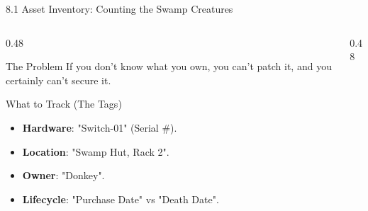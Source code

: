 \documentclass[aspectratio=169]{beamer}  %
\begin{document}
\begin{frame}{8.1 Asset Inventory: Counting the Swamp Creatures}
    \begin{columns}[T]
        \begin{column}{0.48\textwidth}
            \begin{block}{The Problem}
                \footnotesize
                If you don't know what you own, you can't patch it, and you certainly can't secure it.
            \end{block}
            \begin{exampleblock}{What to Track (The Tags)}
                \footnotesize
                \begin{itemize}
                    \item \textbf{Hardware}: "Switch-01" (Serial \#).
                    \item \textbf{Location}: "Swamp Hut, Rack 2".
                    \item \textbf{Owner}: "Donkey".
                    \item \textbf{Lifecycle}: "Purchase Date" vs "Death Date".
                \end{itemize}
            \end{exampleblock}
        \end{column}
        \begin{column}{0.48\textwidth}
            \begin{center}
            \end{center}
        \end{column}
    \end{columns}
\end{frame}
\end{document}
